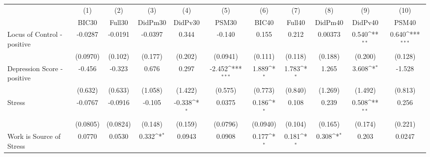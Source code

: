 {
\def\sym#1{\ifmmode^{#1}\else\(^{#1}\)\fi}
\begin{tabular}{l*{10}{c}}
\toprule
            &\multicolumn{1}{c}{(1)}&\multicolumn{1}{c}{(2)}&\multicolumn{1}{c}{(3)}&\multicolumn{1}{c}{(4)}&\multicolumn{1}{c}{(5)}&\multicolumn{1}{c}{(6)}&\multicolumn{1}{c}{(7)}&\multicolumn{1}{c}{(8)}&\multicolumn{1}{c}{(9)}&\multicolumn{1}{c}{(10)}\\
            &\multicolumn{1}{c}{BIC30}&\multicolumn{1}{c}{Full30}&\multicolumn{1}{c}{DidPm30}&\multicolumn{1}{c}{DidPv30}&\multicolumn{1}{c}{PSM30}&\multicolumn{1}{c}{BIC40}&\multicolumn{1}{c}{Full40}&\multicolumn{1}{c}{DidPm40}&\multicolumn{1}{c}{DidPv40}&\multicolumn{1}{c}{PSM40}\\
\midrule
Locus of Control - positive&     -0.0287         &     -0.0191         &     -0.0397         &       0.344         &      -0.140         &       0.155         &       0.212         &     0.00373         &       0.540\sym{**} &       0.640\sym{***}\\
            &    (0.0970)         &     (0.102)         &     (0.177)         &     (0.202)         &    (0.0941)         &     (0.111)         &     (0.118)         &     (0.188)         &     (0.200)         &     (0.128)         \\
\addlinespace
Depression Score - positive&      -0.456         &      -0.323         &       0.676         &       0.297         &      -2.452\sym{***}&       1.889\sym{*}  &       1.783\sym{*}  &       1.265         &       3.608\sym{*}  &      -1.528         \\
            &     (0.632)         &     (0.633)         &     (1.058)         &     (1.422)         &     (0.575)         &     (0.773)         &     (0.840)         &     (1.269)         &     (1.492)         &     (0.813)         \\
\addlinespace
Stress      &     -0.0767         &     -0.0916         &      -0.105         &      -0.338\sym{*}  &      0.0375         &       0.186\sym{*}  &       0.108         &       0.239         &       0.508\sym{**} &       0.256         \\
            &    (0.0805)         &    (0.0824)         &     (0.148)         &     (0.159)         &    (0.0796)         &    (0.0940)         &     (0.104)         &     (0.165)         &     (0.174)         &     (0.221)         \\
\addlinespace
Work is Source of Stress&      0.0770         &      0.0530         &       0.332\sym{*}  &      0.0943         &      0.0908         &       0.177\sym{*}  &       0.181\sym{*}  &       0.308\sym{*}  &       0.203         &      0.0247         \\

\end{tabular}}
